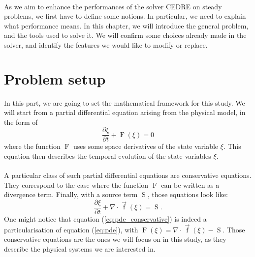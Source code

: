   \paragraph{}
  As we aim to enhance the performances of the solver CEDRE on steady problems, we first have to define some notions.
  In particular, we need to explain what performance means.
  In this chapter, we will introduce the general problem, and the tools used to solve it.
  We will confirm some choices already made in the solver, and identify the features we would like to modify or replace.

  \section{Problem setup}

    \paragraph{}
    In this part, we are going to set the mathematical framework for this study.
    We will start from a partial differential equation arising from the physical model, in the form of
    \begin{equation}\label{eq:pde}
      \frac{\partial \xi}{\partial t} + \operatorname{F}\left(\xi\right) = 0
    \end{equation}
    where the function $\operatorname{F}$ uses some space derivatives of the state variable $\xi$.
    This equation then describes the temporal evolution of the state variables $\xi$.

    \paragraph{}
    A particular class of such partial differential equations are conservative equations.
    They correspond to the case where the function $\operatorname{F}$ can be written as a divergence term.
    Finally, with a source term $\operatorname{S}$, those equations look like:
    \begin{equation}\label{eq:pde_conservative}
      \frac{\partial \xi}{\partial t} + \nabla \cdot \vec{\operatorname{f}}\left(\xi\right) = \operatorname{S}.
    \end{equation}
    One might notice that equation (\ref{eq:pde_conservative}) is indeed a particularisation of equation (\ref{eq:pde}), with $\operatorname{F}\left(\xi\right) = \nabla\cdot \vec{\operatorname{f}}\left(\xi\right) - \operatorname{S}$.
    Those conservative equations are the ones we will focus on in this study, as they describe the physical systems we are interested in.

